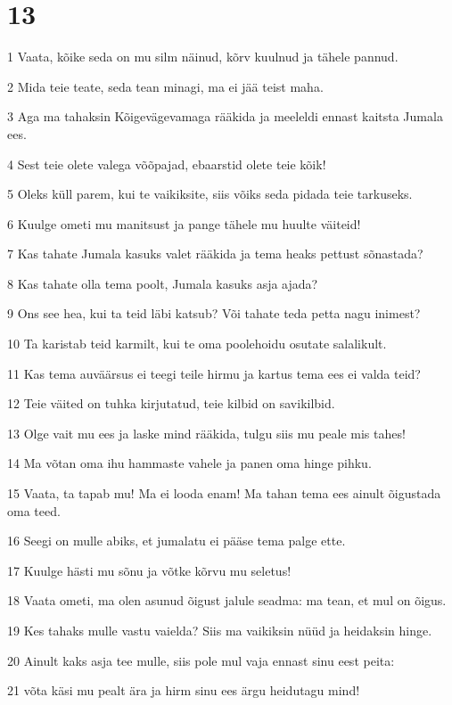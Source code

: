 \chapter{13}

\par 1 Vaata, kõike seda on mu silm näinud, kõrv kuulnud ja tähele pannud.
\par 2 Mida teie teate, seda tean minagi, ma ei jää teist maha.
\par 3 Aga ma tahaksin Kõigevägevamaga rääkida ja meeleldi ennast kaitsta Jumala ees.
\par 4 Sest teie olete valega võõpajad, ebaarstid olete teie kõik!
\par 5 Oleks küll parem, kui te vaikiksite, siis võiks seda pidada teie tarkuseks.
\par 6 Kuulge ometi mu manitsust ja pange tähele mu huulte väiteid!
\par 7 Kas tahate Jumala kasuks valet rääkida ja tema heaks pettust sõnastada?
\par 8 Kas tahate olla tema poolt, Jumala kasuks asja ajada?
\par 9 Ons see hea, kui ta teid läbi katsub? Või tahate teda petta nagu inimest?
\par 10 Ta karistab teid karmilt, kui te oma poolehoidu osutate salalikult.
\par 11 Kas tema auväärsus ei teegi teile hirmu ja kartus tema ees ei valda teid?
\par 12 Teie väited on tuhka kirjutatud, teie kilbid on savikilbid.
\par 13 Olge vait mu ees ja laske mind rääkida, tulgu siis mu peale mis tahes!
\par 14 Ma võtan oma ihu hammaste vahele ja panen oma hinge pihku.
\par 15 Vaata, ta tapab mu! Ma ei looda enam! Ma tahan tema ees ainult õigustada oma teed.
\par 16 Seegi on mulle abiks, et jumalatu ei pääse tema palge ette.
\par 17 Kuulge hästi mu sõnu ja võtke kõrvu mu seletus!
\par 18 Vaata ometi, ma olen asunud õigust jalule seadma: ma tean, et mul on õigus.
\par 19 Kes tahaks mulle vastu vaielda? Siis ma vaikiksin nüüd ja heidaksin hinge.
\par 20 Ainult kaks asja tee mulle, siis pole mul vaja ennast sinu eest peita:
\par 21 võta käsi mu pealt ära ja hirm sinu ees ärgu heidutagu mind!
